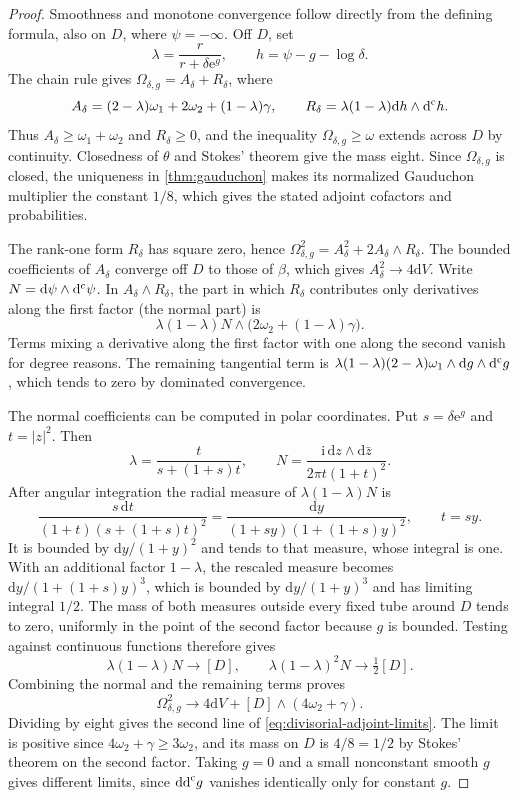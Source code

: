 \begin{proof}
Smoothness and monotone convergence follow directly from the defining formula, also on $D$, where $\psi=-\infty$. Off $D$, set
\[
 \lambda=\frac{r}{r+\delta\mathrm e^g},\qquad
 h=\psi-g-\log\delta.
\]
The chain rule gives $\Omega_{\delta,g}=A_\delta+R_\delta$, where
\[
 A_\delta=(2-\lambda)\omega_1+2\omega_2+(1-\lambda)\gamma,
 \qquad R_\delta=\lambda(1-\lambda)\mathrm dh\wedge\mathrm d^{\mathrm c} h.
\]
Thus $A_\delta\geq\omega_1+\omega_2$ and $R_\delta\geq0$, and the inequality $\Omega_{\delta,g}\geq\omega$ extends across $D$ by continuity. Closedness of $\theta$ and Stokes' theorem give the mass eight. Since $\Omega_{\delta,g}$ is closed, the uniqueness in \cref{thm:gauduchon} makes its normalized Gauduchon multiplier the constant $1/8$, which gives the stated adjoint cofactors and probabilities.

The rank-one form $R_\delta$ has square zero, hence $\Omega_{\delta,g}^2=A_\delta^2+2A_\delta\wedge R_\delta$. The bounded coefficients of $A_\delta$ converge off $D$ to those of $\beta$, which gives $A_\delta^2\to4\mathrm dV$. Write $N=\mathrm d\psi\wedge\mathrm d^{\mathrm c}\psi$. In $A_\delta\wedge R_\delta$, the part in which $R_\delta$ contributes only derivatives along the first factor (the normal part) is
\[
 \lambda(1-\lambda)N\wedge\bigl(2\omega_2+(1-\lambda)\gamma\bigr).
\]
Terms mixing a derivative along the first factor with one along the second vanish for degree reasons. The remaining tangential term is $\lambda(1-\lambda)(2-\lambda)\omega_1\wedge\mathrm dg\wedge\mathrm d^{\mathrm c} g$, which tends to zero by dominated convergence.

The normal coefficients can be computed in polar coordinates. Put $s=\delta\mathrm e^{g}$ and $t=|z|^2$. Then
\[
 \lambda=\frac{t}{s+(1+s)t},\qquad
 N=\frac{\mathrm i\,\mathrm dz\wedge\mathrm d\bar z}{2\pi t(1+t)^2}.
\]
After angular integration the radial measure of $\lambda(1-\lambda)N$ is
\[
 \frac{s\,\mathrm dt}{(1+t)(s+(1+s)t)^2}
 =\frac{\mathrm dy}{(1+sy)(1+(1+s)y)^2},\qquad t=sy.
\]
It is bounded by $\mathrm dy/(1+y)^2$ and tends to that measure, whose integral is one. With an additional factor $1-\lambda$, the rescaled measure becomes $\mathrm dy/(1+(1+s)y)^3$, which is bounded by $\mathrm dy/(1+y)^3$ and has limiting integral $1/2$. The mass of both measures outside every fixed tube around $D$ tends to zero, uniformly in the point of the second factor because $g$ is bounded. Testing against continuous functions therefore gives
\[
 \lambda(1-\lambda)N\longrightarrow[D],\qquad
 \lambda(1-\lambda)^2N\longrightarrow\tfrac12[D].
\]
Combining the normal and the remaining terms proves
\begin{equation}\label{eq:divisorial-square-limit}
 \Omega_{\delta,g}^2\longrightarrow
 4\mathrm dV+[D]\wedge(4\omega_2+\gamma).
\end{equation}
Dividing by eight gives the second line of \eqref{eq:divisorial-adjoint-limits}. The limit is positive since $4\omega_2+\gamma\geq3\omega_2$, and its mass on $D$ is $4/8=1/2$ by Stokes' theorem on the second factor. Taking $g=0$ and a small nonconstant smooth $g$ gives different limits, since $\mathrm{dd}^{\mathrm{c}} g$ vanishes identically only for constant $g$.


\end{proof}
